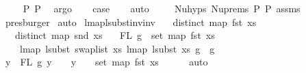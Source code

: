 \begin{isabellebody}
\ \ \ \isamarkupfalse%
\ P{}\ P{}\ \isamarkupfalse%
\ argo\isanewline
\isanewline
\ \ \isamarkupfalse%
\ {\isacharquery}{\kern0pt}case\isanewline
\ \ \isamarkupfalse%
\ auto\isanewline
\ \ \ \isamarkupfalse%
\ Nu{\isachardot}{\kern0pt}hyps\ Nu{\isachardot}{\kern0pt}prems{\isacharparenleft}{\kern0pt}{}{\isacharparenright}{\kern0pt}\ P{}\ P{}\ assms{\isacharparenleft}{\kern0pt}{}{\isacharparenright}{\kern0pt}\ \isamarkupfalse%
\ presburger\isanewline
{}\isamarkupfalse%
\ auto%
\endisatagproof
{\isafoldproof}%
%
\isadelimproof
\isanewline
%
\endisadelimproof
\isanewline
\isanewline
{}\isamarkupfalse%
\ lmap{\isacharunderscore}{\kern0pt}lsubst{\isacharunderscore}{\kern0pt}inv{\isacharunderscore}{\kern0pt}inv{\isacharcolon}{\kern0pt}\isanewline
\ \ \ {\isachardoublequoteopen}distinct\ {\isacharparenleft}{\kern0pt}map\ fst\ xs{\isacharparenright}{\kern0pt}{\isachardoublequoteclose}\isanewline
\ \ \ {\isachardoublequoteopen}distinct\ {\isacharparenleft}{\kern0pt}map\ snd\ xs{\isacharparenright}{\kern0pt}{\isachardoublequoteclose}\isanewline
\ \ \ {\isachardoublequoteopen}FL\ g\ {\isasymsubseteq}\ set\ {\isacharparenleft}{\kern0pt}map\ fst\ xs{\isacharparenright}{\kern0pt}{\isachardoublequoteclose}\isanewline
\ \ \ \ {\isachardoublequoteopen}lmap\ {\isacharparenleft}{\kern0pt}lsubst\ {\isacharparenleft}{\kern0pt}swap{\isacharunderscore}{\kern0pt}list\ xs{\isacharparenright}{\kern0pt}{\isacharparenright}{\kern0pt}\ {\isacharparenleft}{\kern0pt}lmap\ {\isacharparenleft}{\kern0pt}lsubst\ xs{\isacharparenright}{\kern0pt}\ g{\isacharparenright}{\kern0pt}\ {\isacharequal}{\kern0pt}\ g{\isachardoublequoteclose}\isanewline
%
\isadelimproof
%
\endisadelimproof
%
\isatagproof
{}\isamarkupfalse%
\ {\isacharminus}{\kern0pt}\isanewline
\ \ \isamarkupfalse%
\ {\isachardoublequoteopen}{\isasymforall}y\ {\isasymin}\ FL\ g{\isachardot}{\kern0pt}\ y\ {\isachargreater}{\kern0pt}{\isacharequal}{\kern0pt}\ {}\ {\isacharminus}{\kern0pt}{\isacharminus}{\kern0pt}{\isachargreater}{\kern0pt}\ y\ {\isacharminus}{\kern0pt}\ {}\ {\isasymin}\ set\ {\isacharparenleft}{\kern0pt}map\ fst\ xs{\isacharparenright}{\kern0pt}{\isachardoublequoteclose}\isanewline
\ \ \ \ \isamarkupfalse%
\ auto\isanewline

\end{isabellebody}
